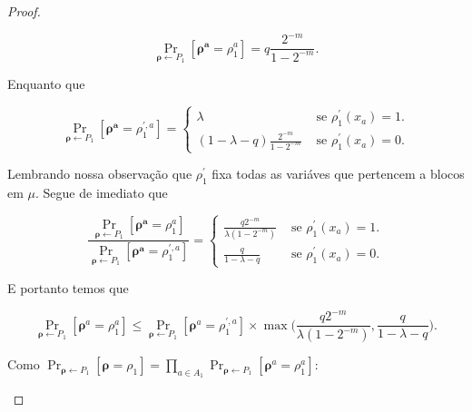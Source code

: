 \begin{proof}
\begin{enumerate}
	\begin{equation*}
		\Pr_{\boldsymbol{\rho} \leftarrow P_{1}}[\boldsymbol{\rho^{a}} = \rho_{1}^{a}] = q\frac{2^{-m}}{1 - 2^{-m}}.
	\end{equation*}

	Enquanto que
	
	\begin{equation*}
		\Pr_{\boldsymbol{\rho} \leftarrow P_{1}}[\boldsymbol{\rho^{a}} = \rho_{1}^{\prime, a}] = \begin{cases}
																 	\lambda & \text{ se } \rho_{1}^{\prime}(x_{a}) = 1. \\
																 	(1 - \lambda - q)\frac{2^{-m}}{1 - 2^{-m}} & \text{ se } \rho_{1}^{\prime}(x_{a}) = 0.
		                                                        									 \end{cases}
	\end{equation*}

	Lembrando nossa observação que $\rho_{1}^{\prime}$ fixa todas as variáves que pertencem a blocos em $\mu$. Segue de imediato que
	
	\begin{equation*}
		\frac{\Pr_{\boldsymbol{\rho} \leftarrow P_{1}}[\boldsymbol{\rho^{a}} = \rho_{1}^{a}]}{\Pr_{\boldsymbol{\rho} \leftarrow P_{1}}[\boldsymbol{\rho^{a}} = \rho_{1}^{\prime, a}]} = \begin{cases}
																													         	\frac{q2^{-m}}{\lambda(1 - 2^{-m})} & \text{ se } \rho_{1}^{\prime}(x_{a}) = 1. \\
																													         	\frac{q}{1 - \lambda - q} & \text{ se } \rho_{1}^{\prime}(x_{a}) = 0.
																													         \end{cases}
	\end{equation*}


	E portanto temos que
	
	\begin{equation} \label{projection_switching_lemma_eq1}
		\Pr_{\boldsymbol{\rho} \leftarrow P_{1}}[\boldsymbol{\rho}^{a} = \rho_{1}^{a}] \leq \Pr_{\boldsymbol{\rho} \leftarrow P_{1}}[\boldsymbol{\rho}^{a} = \rho_{1}^{\prime, a}] \times \max\bigg(\frac{q2^{-m}}{\lambda(1 - 2^{-m})}, \frac{q}{1 - \lambda - q} \bigg).
	\end{equation}
	
	Como $\Pr_{\boldsymbol{\rho} \leftarrow P_{1}}[\boldsymbol{\rho} = \rho_{1}] = \prod_{a \in A_{1}}\Pr_{\boldsymbol{\rho} \leftarrow P_{1}}[\boldsymbol{\rho}^{a} = \rho_{1}^{a}]$:
	

\end{enumerate}
\end{proof}
